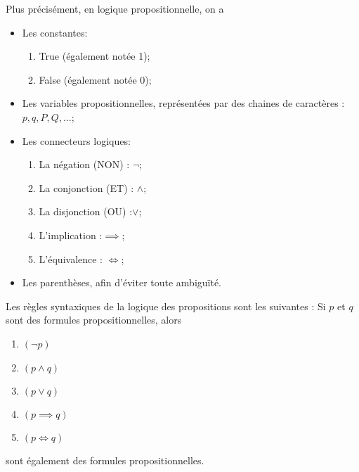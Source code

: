 Plus précisément, en logique propositionnelle, on a 
\begin{itemize}
\item Les constantes: 
\begin{enumerate}[label=(\roman*)]
\item True (également notée 1);
\item False (également notée 0);
\end{enumerate}
\item Les variables propositionnelles, représentées par des chaines de caractères : $p,q,P,Q,\dots$;
\item Les connecteurs logiques: 
\begin{enumerate}[label=(\roman*)]
\item La négation (NON) : \enskip$\neg$\enskip;
\item La conjonction (ET) : \enskip$\land$\enskip;
\item La disjonction (OU) :\enskip$\lor$\enskip;
\item L'implication :\enskip $\implies$\enskip;
\item L'équivalence : \enskip $\Leftrightarrow$\enskip;
\end{enumerate} 
\item Les parenthèses, afin d'éviter toute ambiguïté.
\end{itemize}

Les règles syntaxiques de la logique des propositions sont les suivantes : Si $p$ et $q$ sont des formules propositionnelles, alors 
\begin{enumerate}[label=(\roman*)]
\item  $\left( \neg p \right)$\
\item  $\left( p\land q\right)$
\item  $\left(p \lor q \right)$
\item  $\left( p \implies q \right)$
\item  $\left( p \Leftrightarrow q \right)$
\end{enumerate}
sont également des formules propositionnelles. 
\smallskip


